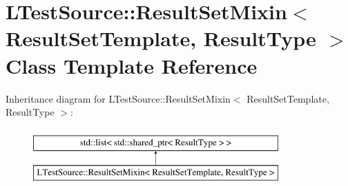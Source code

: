 \hypertarget{class_l_test_source_1_1_result_set_mixin}{\section{L\-Test\-Source\-:\-:Result\-Set\-Mixin$<$ Result\-Set\-Template, Result\-Type $>$ Class Template Reference}
\label{class_l_test_source_1_1_result_set_mixin}
}
Inheritance diagram for L\-Test\-Source\-:\-:Result\-Set\-Mixin$<$ Result\-Set\-Template, Result\-Type $>$\-:\begin{figure}[H]
\begin{center}
\leavevmode
\includegraphics[height=2.000000cm]{class_l_test_source_1_1_result_set_mixin}
\end{center}
\end{figure}
